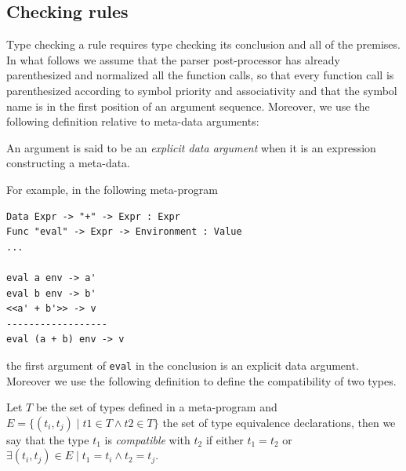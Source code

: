 \subsection{Checking rules}
Type checking a rule requires type checking its conclusion and all of the premises. In what follows we assume that the parser post-processor has already parenthesized and normalized all the function calls, so that every function call is parenthesized according to symbol priority and associativity and that the symbol name is in the first position of an argument sequence. Moreover, we use the following definition relative to meta-data arguments:

\begin{definition}
	An argument is said to be an \textit{explicit data argument} when it is an expression constructing a meta-data.
\end{definition}

\noindent
For example, in the following meta-program

\begin{lstlisting}[caption = Example of an explicit data argument in Metacasanova,  label = code:ch_metacasanova_explicit_data_argument]
Data Expr -> "+" -> Expr : Expr
Func "eval" -> Expr -> Environment : Value
...

eval a env -> a'
eval b env -> b'
<<a' + b'>> -> v
------------------
eval (a + b) env -> v
\end{lstlisting}

\noindent
the first argument of \texttt{eval} in the conclusion is an explicit data argument. Moreover we use the following definition to define the compatibility of two types.

\begin{definition}
\label{def:ch_metacasanova_type_compatibility}
	Let $T$ be the set of types defined in a meta-program and $E = \lbrace (t_i,t_j) \; | \; t1 \in T \wedge t2 \in T \rbrace$ the set of type equivalence declarations, then we say that the type $t_1$ is \textit{compatible} with $t_2$ if either $t_1 = t_2$ or $\exists (t_i,t_j) \in E \; | \; t_1 = t_i \wedge t_2 = t_j$.
\end{definition}

